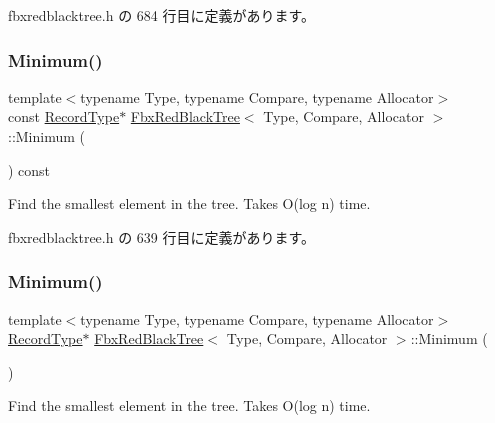  fbxredblacktree.\+h の 684 行目に定義があります。

\mbox{\label{class_fbx_red_black_tree_a9a4565bfb7656d449804fca9a8e56fa1}} 
\subsubsection{\texorpdfstring{Minimum()}{Minimum()}\hspace{0.1cm}{\footnotesize\ttfamily [1/2]}}
{\footnotesize\ttfamily template$<$typename Type, typename Compare, typename Allocator$>$ \\
const \hyperlink{class_fbx_red_black_tree_1_1_record_type}{Record\+Type}$\ast$ \hyperlink{class_fbx_red_black_tree}{Fbx\+Red\+Black\+Tree}$<$ Type, Compare, Allocator $>$\+::Minimum (\begin{DoxyParamCaption}{ }\end{DoxyParamCaption}) const\hspace{0.3cm}{\ttfamily [inline]}}

Find the smallest element in the tree. Takes O(log n) time. 

 fbxredblacktree.\+h の 639 行目に定義があります。

\mbox{\label{class_fbx_red_black_tree_abc02bb7015d4966b5bba54f5e29120da}} 
\subsubsection{\texorpdfstring{Minimum()}{Minimum()}\hspace{0.1cm}{\footnotesize\ttfamily [2/2]}}
{\footnotesize\ttfamily template$<$typename Type, typename Compare, typename Allocator$>$ \\
\hyperlink{class_fbx_red_black_tree_1_1_record_type}{Record\+Type}$\ast$ \hyperlink{class_fbx_red_black_tree}{Fbx\+Red\+Black\+Tree}$<$ Type, Compare, Allocator $>$\+::Minimum (\begin{DoxyParamCaption}{ }\end{DoxyParamCaption})\hspace{0.3cm}{\ttfamily [inline]}}

Find the smallest element in the tree. Takes O(log n) time. 

